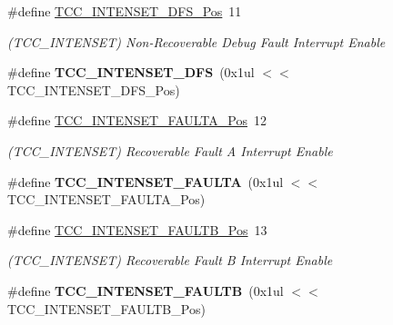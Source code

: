 \begin{DoxyCompactItemize}
\item 
\hypertarget{group___s_a_m_l21___t_c_c_gae503b01399564472b34d04d090b9782e}{}\#define \hyperlink{group___s_a_m_l21___t_c_c_gae503b01399564472b34d04d090b9782e}{T\+C\+C\+\_\+\+I\+N\+T\+E\+N\+S\+E\+T\+\_\+\+D\+F\+S\+\_\+\+Pos}~11\label{group___s_a_m_l21___t_c_c_gae503b01399564472b34d04d090b9782e}

\begin{DoxyCompactList}\small\item\em (T\+C\+C\+\_\+\+I\+N\+T\+E\+N\+S\+E\+T) Non-\/\+Recoverable Debug Fault Interrupt Enable \end{DoxyCompactList}\item 
\hypertarget{group___s_a_m_l21___t_c_c_ga40a6ca1c99c28df4e80040ed4137a7ed}{}\#define {\bfseries T\+C\+C\+\_\+\+I\+N\+T\+E\+N\+S\+E\+T\+\_\+\+D\+F\+S}~(0x1ul $<$$<$ T\+C\+C\+\_\+\+I\+N\+T\+E\+N\+S\+E\+T\+\_\+\+D\+F\+S\+\_\+\+Pos)\label{group___s_a_m_l21___t_c_c_ga40a6ca1c99c28df4e80040ed4137a7ed}

\item 
\hypertarget{group___s_a_m_l21___t_c_c_gac735be925fb4c9dc06e2798b0d1916e0}{}\#define \hyperlink{group___s_a_m_l21___t_c_c_gac735be925fb4c9dc06e2798b0d1916e0}{T\+C\+C\+\_\+\+I\+N\+T\+E\+N\+S\+E\+T\+\_\+\+F\+A\+U\+L\+T\+A\+\_\+\+Pos}~12\label{group___s_a_m_l21___t_c_c_gac735be925fb4c9dc06e2798b0d1916e0}

\begin{DoxyCompactList}\small\item\em (T\+C\+C\+\_\+\+I\+N\+T\+E\+N\+S\+E\+T) Recoverable Fault A Interrupt Enable \end{DoxyCompactList}\item 
\hypertarget{group___s_a_m_l21___t_c_c_gaca8a7b97c7dbfcb5bcf096e3b053878c}{}\#define {\bfseries T\+C\+C\+\_\+\+I\+N\+T\+E\+N\+S\+E\+T\+\_\+\+F\+A\+U\+L\+T\+A}~(0x1ul $<$$<$ T\+C\+C\+\_\+\+I\+N\+T\+E\+N\+S\+E\+T\+\_\+\+F\+A\+U\+L\+T\+A\+\_\+\+Pos)\label{group___s_a_m_l21___t_c_c_gaca8a7b97c7dbfcb5bcf096e3b053878c}

\item 
\hypertarget{group___s_a_m_l21___t_c_c_ga477b6d4e9996cc5329fec59c687327af}{}\#define \hyperlink{group___s_a_m_l21___t_c_c_ga477b6d4e9996cc5329fec59c687327af}{T\+C\+C\+\_\+\+I\+N\+T\+E\+N\+S\+E\+T\+\_\+\+F\+A\+U\+L\+T\+B\+\_\+\+Pos}~13\label{group___s_a_m_l21___t_c_c_ga477b6d4e9996cc5329fec59c687327af}

\begin{DoxyCompactList}\small\item\em (T\+C\+C\+\_\+\+I\+N\+T\+E\+N\+S\+E\+T) Recoverable Fault B Interrupt Enable \end{DoxyCompactList}\item 
\hypertarget{group___s_a_m_l21___t_c_c_ga77a5f7dd9c74a885832ba259b8fd3d5a}{}\#define {\bfseries T\+C\+C\+\_\+\+I\+N\+T\+E\+N\+S\+E\+T\+\_\+\+F\+A\+U\+L\+T\+B}~(0x1ul $<$$<$ T\+C\+C\+\_\+\+I\+N\+T\+E\+N\+S\+E\+T\+\_\+\+F\+A\+U\+L\+T\+B\+\_\+\+Pos)\label{group___s_a_m_l21___t_c_c_ga77a5f7dd9c74a885832ba259b8fd3d5a}


\end{DoxyCompactItemize}
